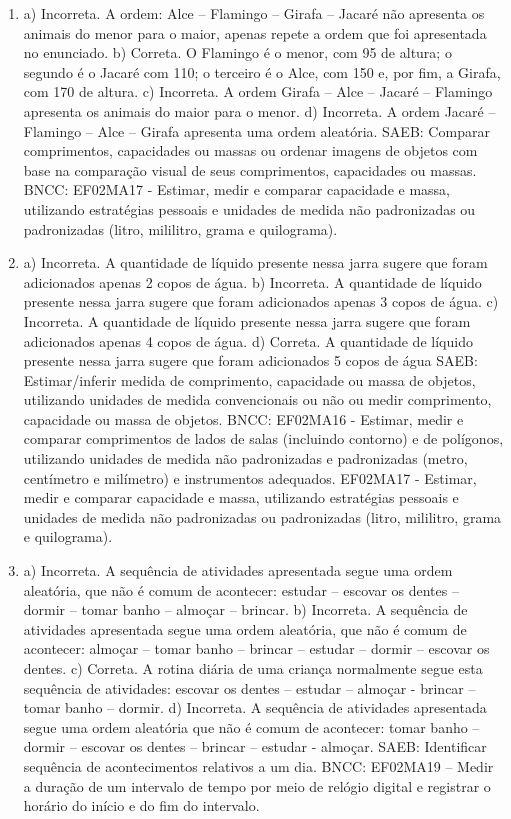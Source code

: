 \begin{enumerate}
\item
a) Incorreta. A ordem: Alce -- Flamingo -- Girafa -- Jacaré não
apresenta os animais do menor para o maior, apenas repete a ordem que
foi apresentada no enunciado.
b) Correta. O Flamingo é o menor, com 95 de altura; o segundo é o Jacaré
com 110; o terceiro é o Alce, com 150 e, por fim, a Girafa, com 170 de
altura.
c) Incorreta. A ordem Girafa -- Alce -- Jacaré -- Flamingo apresenta
os animais do maior para o menor.
d) Incorreta. A ordem Jacaré -- Flamingo -- Alce -- Girafa apresenta
uma ordem aleatória.
SAEB: Comparar comprimentos, capacidades ou massas ou ordenar
imagens de objetos com base na comparação visual de seus comprimentos,
capacidades ou massas.
BNCC: EF02MA17 - Estimar, medir e comparar capacidade
e massa, utilizando estratégias pessoais e unidades de medida não
padronizadas ou padronizadas (litro, mililitro, grama e quilograma).

\item
a) Incorreta. A quantidade de líquido presente nessa jarra sugere que
foram adicionados apenas 2 copos de água.
b) Incorreta. A quantidade de líquido presente nessa jarra sugere que
foram adicionados apenas 3 copos de água.
c) Incorreta. A quantidade de líquido presente nessa jarra sugere que
foram adicionados apenas 4 copos de água.
d) Correta. A quantidade de líquido presente nessa jarra sugere que
foram adicionados 5 copos de água
SAEB: Estimar/inferir medida de comprimento, capacidade ou massa
de objetos, utilizando unidades de medida convencionais ou não ou medir
comprimento, capacidade ou massa de objetos.
BNCC: EF02MA16 - Estimar, medir e comparar comprimentos de lados de
salas (incluindo contorno) e de polígonos, utilizando unidades de medida
não padronizadas e padronizadas (metro, centímetro e milímetro) e
instrumentos adequados. EF02MA17 - Estimar, medir e comparar capacidade
e massa, utilizando estratégias pessoais e unidades de medida não
padronizadas ou padronizadas (litro, mililitro, grama e quilograma).

\item
a) Incorreta. A sequência de atividades apresentada segue uma ordem
aleatória, que não é comum de acontecer: estudar -- escovar os dentes --
dormir -- tomar banho -- almoçar -- brincar.
b) Incorreta. A sequência de atividades apresentada segue uma ordem
aleatória, que não é comum de acontecer: almoçar -- tomar banho -- brincar
-- estudar -- dormir -- escovar os dentes.
c) Correta. A rotina diária de uma criança normalmente segue esta sequência
de atividades: escovar os dentes -- estudar -- almoçar - brincar -- tomar banho -- dormir.
d) Incorreta. A sequência de atividades apresentada segue uma ordem
aleatória que não é comum de acontecer: tomar banho -- dormir -- escovar
os dentes -- brincar -- estudar - almoçar.
SAEB: Identificar sequência de acontecimentos relativos a um dia.
BNCC: EF02MA19 -- Medir a duração de um intervalo de tempo por meio de
relógio digital e registrar o horário do início e do fim do intervalo.


\end{enumerate}

